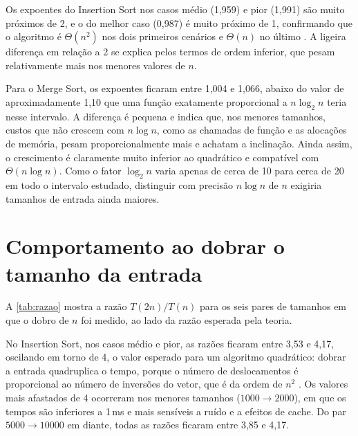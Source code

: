 \documentclass[
    12pt,
    oneside,
    a4paper,
    openany,
    chapter=TITLE,
    english,
    brazil
]{abntex2}
\begin{document}
\begin{table}[H]
    \caption{Expoentes empíricos $k$, obtidos pela inclinação no gráfico log-log}
    \label{tab:expoentes}
    \centering
    \small
    
\end{table}

Os expoentes do Insertion Sort nos casos médio (1,959) e pior (1,991) são muito próximos de 2, e o do melhor caso (0,987) é muito próximo de 1, confirmando que o algoritmo é $\Theta(n^2)$ nos dois primeiros cenários e $\Theta(n)$ no último \cite{cormen2012}. A ligeira diferença em relação a 2 se explica pelos termos de ordem inferior, que pesam relativamente mais nos menores valores de $n$.

Para o Merge Sort, os expoentes ficaram entre 1,004 e 1,066, abaixo do valor de aproximadamente 1,10 que uma função exatamente proporcional a $n \log_2 n$ teria nesse intervalo. A diferença é pequena e indica que, nos menores tamanhos, custos que não crescem com $n \log n$, como as chamadas de função e as alocações de memória, pesam proporcionalmente mais e achatam a inclinação. Ainda assim, o crescimento é claramente muito inferior ao quadrático e compatível com $\Theta(n \log n)$. Como o fator $\log_2 n$ varia apenas de cerca de 10 para cerca de 20 em todo o intervalo estudado, distinguir com precisão $n \log n$ de $n$ exigiria tamanhos de entrada ainda maiores.

\section{Comportamento ao dobrar o tamanho da entrada}
\label{sec:dobro}

A \autoref{tab:razao} mostra a razão $T(2n)/T(n)$ para os seis pares de tamanhos em que o dobro de $n$ foi medido, ao lado da razão esperada pela teoria.

\begin{table}[H]
    \caption{Razão $T(2n)/T(n)$ entre os tempos médios ao dobrar $n$}
    \label{tab:razao}
    \centering
    \small
    
\end{table}

No Insertion Sort, nos casos médio e pior, as razões ficaram entre 3,53 e 4,17, oscilando em torno de 4, o valor esperado para um algoritmo quadrático: dobrar a entrada quadruplica o tempo, porque o número de deslocamentos é proporcional ao número de inversões do vetor, que é da ordem de $n^2$ \cite{knuth1998}. Os valores mais afastados de 4 ocorreram nos menores tamanhos ($\num{1000} \to \num{2000}$), em que os tempos são inferiores a 1\,ms e mais sensíveis a ruído e a efeitos de cache. Do par $\num{5000} \to \num{10000}$ em diante, todas as razões ficaram entre 3,85 e 4,17.
\end{document}
